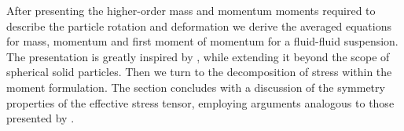 









After presenting the higher-order mass and momentum moments required to describe the particle rotation and deformation we derive the averaged equations for mass, momentum and first moment of momentum for a fluid-fluid suspension.
The presentation is greatly inspired by \citep{lhuillier2009rheology}, while extending it beyond the scope of spherical solid particles.
Then we turn to the decomposition of stress within the moment formulation. 
The section concludes with a discussion of the symmetry properties of the effective stress tensor, employing arguments analogous to those presented by \citet{lhuillier1996contribution}.

